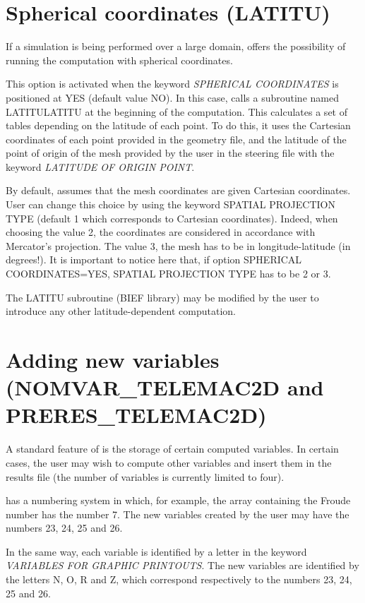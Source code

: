 \section{ Spherical coordinates (LATITU) }
\label{sec:spher:coord:LATI}
 If a simulation is being performed over a large domain,  offers the possibility of running the computation with spherical coordinates.

 This option is activated when the keyword \textit{SPHERICAL COORDINATES} is positioned at YES (default value NO). In this case,  calls a subroutine named LATITULATITU at the beginning of the computation. This calculates a set of tables depending on the latitude of each point. To do this, it uses the Cartesian coordinates of each point provided in the geometry file, and the latitude of the point of origin of the mesh provided by the user in the steering file with the keyword \textit{LATITUDE OF ORIGIN POINT}.

 By default,  assumes that the mesh coordinates are given Cartesian coordinates. User can change this choice by using the keyword SPATIAL PROJECTION TYPE (default 1 which corresponds to Cartesian coordinates). Indeed, when choosing the value 2, the coordinates are considered in accordance with Mercator's projection. The value 3, the mesh has to be in longitude-latitude (in degrees!). It is important to notice here that, if option SPHERICAL COORDINATES=YES, SPATIAL PROJECTION TYPE has to be 2 or 3.

 The LATITU subroutine (BIEF library) may be modified by the user to introduce any other latitude-dependent computation.


\section{ Adding new variables (NOMVAR\_TELEMAC2D and PRERES\_TELEMAC2D)}

 A standard feature of  is the storage of certain computed variables. In certain cases, the user may wish to compute other variables and insert them in the results file (the number of variables is currently limited to four).

  has a numbering system in which, for example, the array containing the Froude number has the number 7. The new variables created by the user may have the numbers 23, 24, 25 and 26.

 In the same way, each variable is identified by a letter in the keyword \textit{VARIABLES FOR GRAPHIC PRINTOUTS}. The new variables are identified by the letters N, O, R and Z, which correspond respectively to the numbers 23, 24, 25 and 26.

